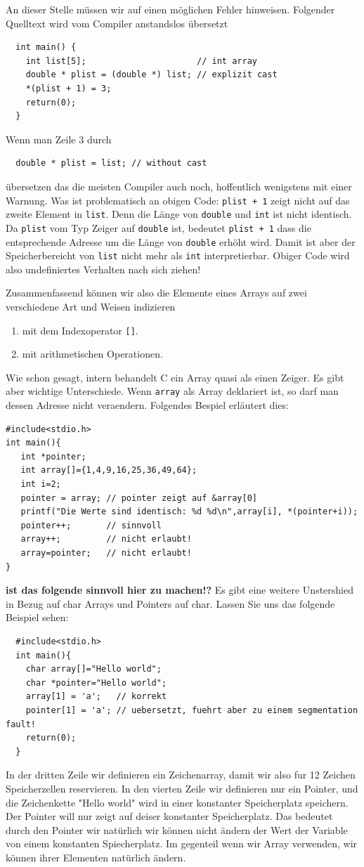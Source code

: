 An dieser Stelle müssen wir auf einen möglichen Fehler hinweisen.
Folgender Quelltext wird vom Compiler anstandslos übersetzt
\begin{lstlisting}
  int main() {
    int list[5];                      // int array
    double * plist = (double *) list; // explizit cast
    *(plist + 1) = 3;
    return(0);
  }
\end{lstlisting}
Wenn man Zeile $3$ durch
\begin{lstlisting}
  double * plist = list; // without cast
\end{lstlisting}
übersetzen das die meisten Compiler auch noch, hoffentlich wenigstens mit einer Warnung.
Was ist problematisch an obigen Code:
\verb|plist + 1| zeigt nicht auf das zweite Element in \verb|list|.
Denn die Länge von \verb|double| und \verb|int| ist nicht identisch.
Da \verb|plist| vom Typ Zeiger auf \verb|double| ist, bedeutet \verb|plist + 1| dass die entsprechende Adresse um die Länge von \verb|double| erhöht wird.
Damit ist aber der Speicherbereicht von \verb|list| nicht mehr als \verb|int| interpretierbar.
Obiger Code wird also undefiniertes Verhalten nach sich ziehen!

Zusammenfassend können wir also die Elemente eines Arrays auf zwei verschiedene Art und Weisen indizieren
\begin{enumerate}
\item mit dem Indexoperator \verb|[]|.
\item mit arithmetischen Operationen.
\end{enumerate}
Wie schon gesagt, intern behandelt C ein Array quasi als einen Zeiger.
Es gibt aber wichtige Unterschiede.
Wenn \verb|array| als Array deklariert ist, so darf man dessen Adresse nicht veraendern.
Folgendes Bespiel erläutert dies:
\begin{lstlisting}
#include<stdio.h>
int main(){
   int *pointer;
   int array[]={1,4,9,16,25,36,49,64};
   int i=2;
   pointer = array; // pointer zeigt auf &array[0]
   printf("Die Werte sind identisch: %d %d\n",array[i], *(pointer+i));
   pointer++;       // sinnvoll
   array++;         // nicht erlaubt!
   array=pointer;   // nicht erlaubt!
}
\end{lstlisting}

\textbf{ist das folgende sinnvoll hier zu machen!?} 
Es gibt eine weitere Unstershied in Bezug auf char Arrays und Pointers auf char. Lassen
Sie uns das folgende Beispiel sehen:
\begin{lstlisting}
  #include<stdio.h>
  int main(){
    char array[]="Hello world";
    char *pointer="Hello world";
    array[1] = 'a';   // korrekt
    pointer[1] = 'a'; // uebersetzt, fuehrt aber zu einem segmentation fault!
    return(0);
  }
\end{lstlisting}
In der dritten Zeile wir definieren ein Zeichenarray, damit wir also fur 12 Zeichen Speicherzellen reservieren. 
In den vierten Zeile wir definieren nur ein Pointer, und die Zeichenkette "Hello world" wird in einer konstanter
Speicherplatz speichern. Der Pointer will nur zeigt auf deiser konstanter Speicherplatz. Das bedeutet durch den
Pointer wir natürlich wir können nicht ändern der Wert der Variable von einem konstanten Spiecherplatz. Im gegenteil
wenn wir Array verwenden, wir können ihrer Elementen natürlich ändern.

